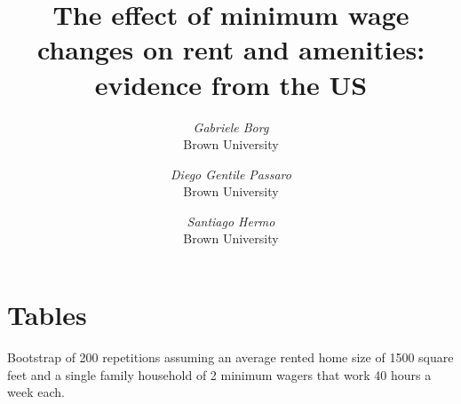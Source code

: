 \documentclass{article}
\title{The effect of minimum wage changes on rent and amenities: evidence from the US}
\author{
	\textit{Gabriele Borg} \\
	\small Brown University 
	\and
	\textit{Diego Gentile Passaro} \\
	\small Brown University
	\and
	\textit{Santiago Hermo} \\
	\small Brown University
}
\begin{document}
\maketitle

\section*{Tables}

Bootstrap of 200 repetitions assuming an average rented home size of 1500 square feet and a single family household of 2 minimum wagers that work 40 hours a week each. 
\begin{table}[h!]
\centering

\end{table}
\end{document}
